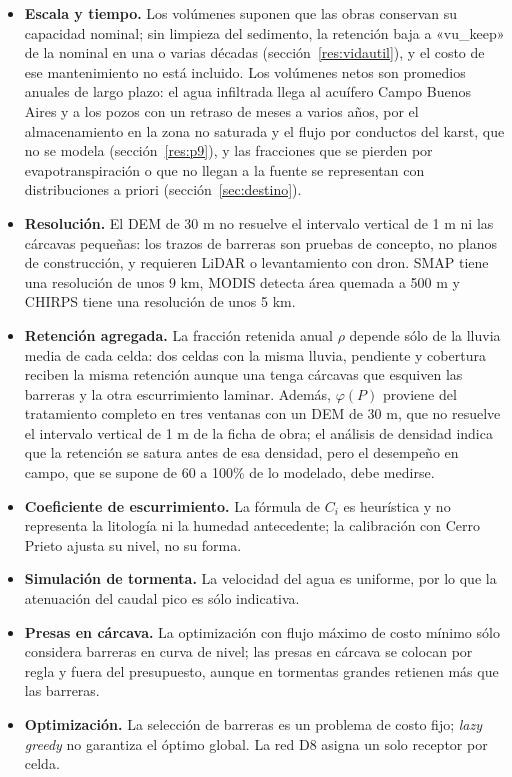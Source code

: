 \begin{itemize}
  \item \textbf{Escala y tiempo.} Los volúmenes suponen que las obras conservan su capacidad nominal; sin limpieza del sedimento, la retención baja a «vu_keep» de la nominal en una o varias décadas (sección~\ref{res:vidautil}), y el costo de ese mantenimiento no está incluido. Los volúmenes netos son promedios anuales de largo plazo: el agua infiltrada llega al acuífero Campo Buenos Aires y a los pozos con un retraso de meses a varios años, por el almacenamiento en la zona no saturada y el flujo por conductos del karst, que no se modela (sección~\ref{res:p9}), y las fracciones que se pierden por evapotranspiración o que no llegan a la fuente se representan con distribuciones a priori (sección~\ref{sec:destino}).
  \item \textbf{Resolución.} El DEM de 30 m no resuelve el intervalo vertical de 1 m ni las cárcavas pequeñas: los trazos de barreras son pruebas de concepto, no planos de construcción, y requieren LiDAR o levantamiento con dron. SMAP tiene una resolución de unos 9 km, MODIS detecta área quemada a 500 m y CHIRPS tiene una resolución de unos 5 km.
  \item \textbf{Retención agregada.} La fracción retenida anual $\rho$ depende sólo de la lluvia media de cada celda: dos celdas con la misma lluvia, pendiente y cobertura reciben la misma retención aunque una tenga cárcavas que esquiven las barreras y la otra escurrimiento laminar. Además, $\varphi(P)$ proviene del tratamiento completo en tres ventanas con un DEM de 30 m, que no resuelve el intervalo vertical de 1 m de la ficha de obra; el análisis de densidad indica que la retención se satura antes de esa densidad, pero el desempeño en campo, que se supone de 60 a 100\% de lo modelado, debe medirse.
  \item \textbf{Coeficiente de escurrimiento.} La fórmula de $C_i$ es heurística y no representa la litología ni la humedad antecedente; la calibración con Cerro Prieto ajusta su nivel, no su forma.
  \item \textbf{Simulación de tormenta.} La velocidad del agua es uniforme, por lo que la atenuación del caudal pico es sólo indicativa.
  \item \textbf{Presas en cárcava.} La optimización con flujo máximo de costo mínimo sólo considera barreras en curva de nivel; las presas en cárcava se colocan por regla y fuera del presupuesto, aunque en tormentas grandes retienen más que las barreras.
  \item \textbf{Optimización.} La selección de barreras es un problema de costo fijo; \emph{lazy greedy} no garantiza el óptimo global. La red D8 asigna un solo receptor por celda.

\end{itemize}

